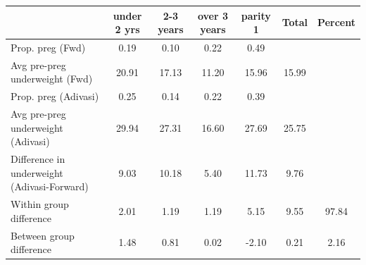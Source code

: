 \begin{tabular}{l*{6}{c}}
\toprule
            &\multicolumn{1}{c}{under 2 yrs}&\multicolumn{1}{c}{2-3 years}&\multicolumn{1}{c}{over 3 years}&\multicolumn{1}{c}{parity 1}&\multicolumn{1}{c}{Total}&\multicolumn{1}{c}{Percent}\\
\midrule
\midrule
Prop. preg (Fwd)&        0.19&        0.10&        0.22&        0.49&            &            \\
Avg pre-preg underweight (Fwd)&       20.91&       17.13&       11.20&       15.96&       15.99&            \\
Prop. preg (Adivasi)&        0.25&        0.14&        0.22&        0.39&            &            \\
Avg pre-preg underweight (Adivasi)&       29.94&       27.31&       16.60&       27.69&       25.75&            \\
Difference in underweight (Adivasi-Forward)&        9.03&       10.18&        5.40&       11.73&        9.76&            \\
Within group difference&        2.01&        1.19&        1.19&        5.15&        9.55&       97.84\\
Between group difference&        1.48&        0.81&        0.02&       -2.10&        0.21&        2.16\\
\bottomrule
\end{tabular}

